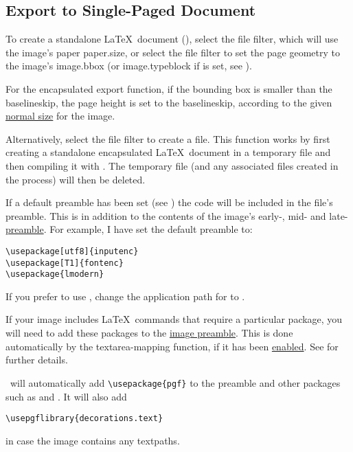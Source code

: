 
\subsection{Export to Single-Paged Document}\label{sec:exportdoc}

To create a standalone \LaTeX\ document (), select
the  file filter, which will use the image's
paper \gls{paper.size}, or select the  file filter to
set the page geometry to the image's \gls{image.bbox} (or \gls{image.typeblock}
if  is set, see
).

\begin{information}
For the encapsulated export function,
if the bounding box is smaller than the baselineskip, the page
height is set to the baselineskip, according to the given
\hyperref[sec:normalsize]{normal size} for the image.
\end{information}

Alternatively, select the  file filter to create
a  file.  This function works by first creating a
standalone encapsulated \LaTeX\ document in a temporary file and
then compiling it with . The temporary file (and any
associated files created in the process) will then be deleted.

If a default preamble has been set (see
) the code will be included in the
 file's preamble.  This is in
addition to the contents of the image's early-, mid- and
late-\hyperref[sec:preamble]{preamble}. For example, I have set the
default preamble to:
\begin{verbatim}
\usepackage[utf8]{inputenc}
\usepackage[T1]{fontenc}
\usepackage{lmodern}
\end{verbatim}
If you prefer to use , change the application path for
 to .

If your image includes \LaTeX\ commands that require a particular
package, you will need to add these packages to the
\hyperref[sec:preamble]{image preamble}. This is done automatically
by the \gls{textarea-mapping} function, if it has been
\hyperref[mi:texmappings]{enabled}.  See
 for further details.

\FlowframTk\ will automatically add
\verb|\usepackage{pgf}| to the preamble and other packages such as
 and . It will also add
\begin{verbatim}
\usepgflibrary{decorations.text}
\end{verbatim}
in case the image contains any \glspl{textpath}.

